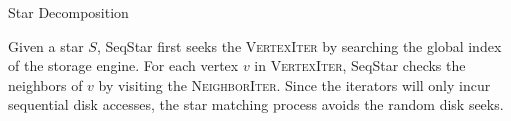 \begin{algorithm}[ht]
  \caption{Star Decomposition}\label{alg:decompose_stars}
\end{algorithm}

Given a star $S$, SeqStar first seeks the \textsc{VertexIter} by searching the global index of the storage engine.
For each vertex $v$ in \textsc{VertexIter},
SeqStar checks the neighbors of $v$ by visiting the \textsc{NeighborIter}.
Since the iterators will only incur sequential disk accesses,
the star matching process avoids the random disk seeks.

